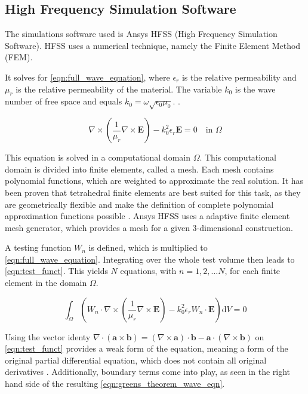\subsection{High Frequency Simulation Software}

The simulations software used is Ansys HFSS (High Frequency Simulation Software). HFSS uses a numerical technique, namely the Finite Element Method (FEM). 


It solves for \autoref{eqn:full_wave_equation}, where $\epsilon_r$ is the relative permeability and $\mu_r$ is the relative permeability of the material. The variable $k_0$ is the wave number of free space and equals $k_0=\omega\sqrt{\epsilon_0\mu_0}$. \cite{Cendes_Lee_1988,Lee_Sun_Cendes_1991,Cendes_1991}.

\begin{equation}
    \nabla\times\left(\frac{1}{\mu_r}\nabla\times\mathbf{E}\right)-k_0^2\epsilon_r\mathbf{E}=0 \quad\text{in $\Omega$}
    \label{eqn:full_wave_equation}
\end{equation}

This equation is solved in a computational domain $\Omega$. This computational domain is divided into finite elements, called a mesh. Each mesh contains polynomial functions, which are weighted to approximate the real solution. It has been proven that tetrahedral finite elements are best suited for this task, as they are geometrically flexible and make the definition of complete polynomial approximation functions possible \cite{Shenton_Cendes_1985}. Ansys HFSS uses a adaptive finite element mesh generator, which provides a mesh for a given 3-dimensional construction. 

A testing function $W_n$ is defined, which is multiplied to \autoref{eqn:full_wave_equation}. Integrating over the whole test volume then leads to \autoref{eqn:test_funct}. This yields $N$ equations, with $n=1,2,...N$, for each finite element in the domain $\Omega$.

\begin{equation}
    \int_\Omega\left( W_n\cdot\nabla \times\left( \frac{1}{\mu_r}\nabla\times\mathbf{E} \right)-k_0^2\epsilon_rW_n\cdot\mathbf{E} \right)\mathrm{d}V=0
    \label{eqn:test_funct}
\end{equation}

Using the vector identy $\nabla\cdot\left(\mathbf{a}\times\mathbf{b}\right)=\left(\nabla\times\mathbf{a}\right)\cdot\mathbf{b}-\mathbf{a}\cdot\left(\nabla\times\mathbf{b}\right)$  on \autoref{eqn:test_funct} provides a weak form of the equation, meaning a form of the original partial differential equation, which does not contain all original derivatives \cite{Cendes_Lee_1988,Cendes_1991}. Additionally, boundary terms come into play, as seen in the right hand side of the resulting \autoref{eqn:greens_theorem_wave_eqn}. 


